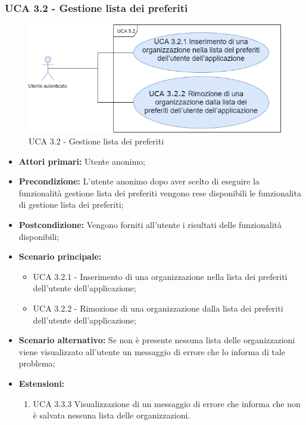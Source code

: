 \subsubsection{UCA 3.2 - Gestione lista dei preferiti}%

\begin{figure}[h]
	\centering
	
	\includegraphics[scale=0.5]{sezioni/UseCase/Immagini/UCA3.2.png}
	\caption{UCA 3.2 - Gestione lista dei preferiti}
\end{figure}

\begin{itemize}
	\item \textbf{Attori primari:} Utente anonimo;
	\item \textbf{Precondizione:} L'utente anonimo dopo aver scelto di eseguire la funzionalità gestione lista dei preferiti vengono rese disponibili le funzionalita di gestione lista dei preferiti; 
	\item \textbf{Postcondizione:} Vengono forniti all'utente i risultati delle funzionalità disponibili;
	\item \textbf{Scenario principale:}
			\begin{itemize}
			\item UCA 3.2.1 - Inserimento di una organizzazione nella lista dei preferiti dell'utente dell'applicazione;
			\item UCA 3.2.2 - Rimozione di una organizzazione dalla lista dei preferiti dell'utente dell'applicazione;
			\end{itemize}
	\item \textbf{Scenario alternativo:} Se non è presente nessuna lista delle organizzazioni viene visualizzato all'utente un messaggio di errore che lo informa di tale problema;
	\item \textbf{Estensioni:}
	\begin{enumerate}
		\item UCA 3.3.3 Visualizzazione di un messaggio di errore che informa che non è salvata nessuna lista delle organizzazioni.
	\end{enumerate}
\end{itemize}

